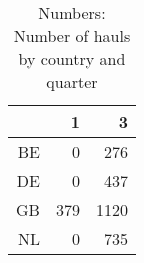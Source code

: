 \begin{table}[ht]
\centering
\begin{tabular}{rrr}
  \hline
 & 1 & 3 \\ 
  \hline
BE & 0 & 276 \\ 
  DE & 0 & 437 \\ 
  GB & 379 & 1120 \\ 
  NL & 0 & 735 \\ 
   \hline
\end{tabular}
\caption{Numbers: Number of hauls by country and quarter} 
\end{table}
